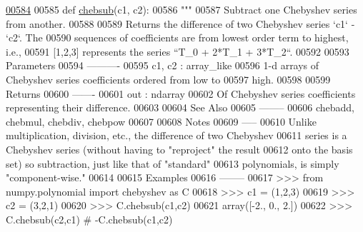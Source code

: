 \begin{DoxyCode}
\hypertarget{namespacepyneb_1_1utils_1_1chebyshev_l00584}{}\hyperlink{namespacepyneb_1_1utils_1_1chebyshev_a2ca3ca3bac02e30625edb4c48ada7ddf}{00584} 
00585 \textcolor{keyword}{def }\hyperlink{namespacepyneb_1_1utils_1_1chebyshev_a2ca3ca3bac02e30625edb4c48ada7ddf}{chebsub}(c1, c2):
00586     \textcolor{stringliteral}{"""}
00587 \textcolor{stringliteral}{    Subtract one Chebyshev series from another.}
00588 \textcolor{stringliteral}{}
00589 \textcolor{stringliteral}{    Returns the difference of two Chebyshev series `c1` - `c2`.  The}
00590 \textcolor{stringliteral}{    sequences of coefficients are from lowest order term to highest, i.e.,}
00591 \textcolor{stringliteral}{    [1,2,3] represents the series ``T\_0 + 2*T\_1 + 3*T\_2``.}
00592 \textcolor{stringliteral}{}
00593 \textcolor{stringliteral}{    Parameters}
00594 \textcolor{stringliteral}{    ----------}
00595 \textcolor{stringliteral}{    c1, c2 : array\_like}
00596 \textcolor{stringliteral}{        1-d arrays of Chebyshev series coefficients ordered from low to}
00597 \textcolor{stringliteral}{        high.}
00598 \textcolor{stringliteral}{}
00599 \textcolor{stringliteral}{    Returns}
00600 \textcolor{stringliteral}{    -------}
00601 \textcolor{stringliteral}{    out : ndarray}
00602 \textcolor{stringliteral}{        Of Chebyshev series coefficients representing their difference.}
00603 \textcolor{stringliteral}{}
00604 \textcolor{stringliteral}{    See Also}
00605 \textcolor{stringliteral}{    --------}
00606 \textcolor{stringliteral}{    chebadd, chebmul, chebdiv, chebpow}
00607 \textcolor{stringliteral}{}
00608 \textcolor{stringliteral}{    Notes}
00609 \textcolor{stringliteral}{    -----}
00610 \textcolor{stringliteral}{    Unlike multiplication, division, etc., the difference of two Chebyshev}
00611 \textcolor{stringliteral}{    series is a Chebyshev series (without having to "reproject" the result}
00612 \textcolor{stringliteral}{    onto the basis set) so subtraction, just like that of "standard"}
00613 \textcolor{stringliteral}{    polynomials, is simply "component-wise."}
00614 \textcolor{stringliteral}{}
00615 \textcolor{stringliteral}{    Examples}
00616 \textcolor{stringliteral}{    --------}
00617 \textcolor{stringliteral}{    >>> from numpy.polynomial import chebyshev as C}
00618 \textcolor{stringliteral}{    >>> c1 = (1,2,3)}
00619 \textcolor{stringliteral}{    >>> c2 = (3,2,1)}
00620 \textcolor{stringliteral}{    >>> C.chebsub(c1,c2)}
00621 \textcolor{stringliteral}{    array([-2.,  0.,  2.])}
00622 \textcolor{stringliteral}{    >>> C.chebsub(c2,c1) # -C.chebsub(c1,c2)}

\end{DoxyCode}
